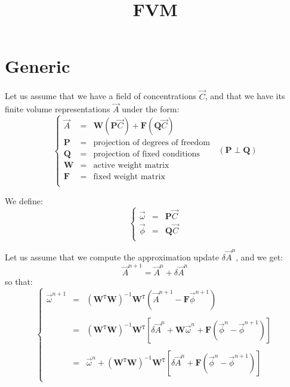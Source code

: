 \documentclass[aps,onecolumn,11pt]{revtex4}
\newcommand{\mat}[1]{{\bm{#1}}}
\newcommand{\trn}[1]{{{{#1}}^{\mathtt{T}}}}
\begin{document}
\title{FVM}
\maketitle

 
\section{Generic}

Let us assume that we have a field of concentrations $\vec{C}$,
and that we have its finite volume representations $\vec{A}$ under the form:
\begin{equation}
\left\lbrace
\begin{array}{rcl}
	\vec{A} & = & \mat{W} \left(\mat{P}\vec{C}\right) + \mat{F} \left(\mat{Q}\vec{C}\right)\\
	\mat{P} & = & \text{projection of degrees of freedom}\\
	\mat{Q} & = & \text{projection of fixed conditions}\\
	\mat{W} & = & \text{active weight matrix}\\
	\mat{F} & = & \text{fixed weight matrix}\\
\end{array}
\right.
\;\;(\mat{P} \perp \mat{Q})
\end{equation}

We define:
\begin{equation}
\left\lbrace
\begin{array}{rcl}
	\vec{\omega} & = & \mat{P}\vec{C}\\
	\vec{\phi}   & = & \mat{Q}\vec{C}\\
\end{array}
\right.
\end{equation}

Let us assume that we compute the approximation update $\delta\vec{A}^n$, and we get:
\begin{equation}
	\vec{A}^{n+1} = \vec{A}^n + \delta\vec{A}^n
\end{equation}
so that:
\begin{equation}
\left\lbrace
\begin{array}{rcl}
	\vec{\omega}^{n+1} & = & \left(\trn{\mat{W}}\mat{W}\right)^{-1} \trn{\mat{W}} \left( \vec{A}^{n+1} -   \mat{F} \vec{\phi}^{n+1}\right)\\
	\\
	& = &  \left(\trn{\mat{W}}\mat{W}\right)^{-1} \trn{\mat{W}} 
	\left[ \delta\vec{A}^{n} + \mat{W} \vec{\omega}^n + \mat{F} \left(\vec{\phi}^{n} - \vec{\phi}^{n+1}\right) \right]\\
	\\
	& = & \vec{\omega}^n + 
	\left(\trn{\mat{W}}\mat{W}\right)^{-1} \trn{\mat{W}} \left[ \delta\vec{A}^{n} + \mat{F} \left(\vec{\phi}^{n} - \vec{\phi}^{n+1}\right) \right]\\
\end{array}
\right.
\end{equation}
\end{document}
